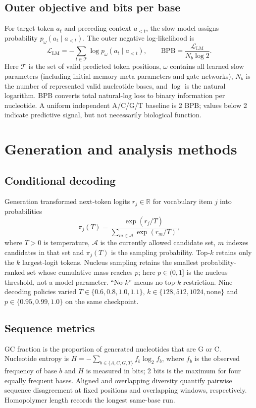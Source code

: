 \documentclass[10pt,twocolumn]{article}
\newcommand{\R}{\mathbb{R}}
\begin{document}
\subsection*{Outer objective and bits per base}
For target token $a_t$ and preceding context $a_{<t}$, the slow model assigns probability $p_{\omega}(a_t\mid a_{<t})$. The outer negative log-likelihood is
\begin{equation}
\mathcal L_{\mathrm{LM}}=-\sum_{t\in\mathcal T}\log p_{\omega}(a_t\mid a_{<t}),\qquad
\mathrm{BPB}=\frac{\mathcal L_{\mathrm{LM}}}{N_b\log 2}.\label{eq:bpb}
\end{equation}
Here $\mathcal T$ is the set of valid predicted token positions, $\omega$ contains all learned slow parameters (including initial memory meta-parameters and gate networks), $N_b$ is the number of represented valid nucleotide bases, and $\log$ is the natural logarithm. BPB converts total natural-log loss to binary information per nucleotide. A uniform independent A/C/G/T baseline is 2 BPB; values below 2 indicate predictive signal, but not necessarily biological function.

\section*{Generation and analysis methods}
\subsection*{Conditional decoding}
Generation transformed next-token logits $r_j\in\R$ for vocabulary item $j$ into probabilities
\begin{equation}
\pi_j(T)=\frac{\exp(r_j/T)}{\sum_{m\in\mathcal A}\exp(r_m/T)},\label{eq:softmax}
\end{equation}
where $T>0$ is temperature, $\mathcal A$ is the currently allowed candidate set, $m$ indexes candidates in that set and $\pi_j(T)$ is the sampling probability. Top-$k$ retains only the $k$ largest-logit tokens. Nucleus sampling retains the smallest probability-ranked set whose cumulative mass reaches $p$; here $p\in(0,1]$ is the nucleus threshold, not a model parameter. ``No-$k$'' means no top-$k$ restriction. Nine decoding policies varied $T\in\{0.6,0.8,1.0,1.1\}$, $k\in\{128,512,1024,\text{none}\}$ and $p\in\{0.95,0.99,1.0\}$ on the same checkpoint.

\subsection*{Sequence metrics}
GC fraction is the proportion of generated nucleotides that are G or C. Nucleotide entropy is $H=-\sum_{b\in\{A,C,G,T\}}f_b\log_2 f_b$, where $f_b$ is the observed frequency of base $b$ and $H$ is measured in bits; 2 bits is the maximum for four equally frequent bases. Aligned and overlapping diversity quantify pairwise sequence disagreement at fixed positions and overlapping windows, respectively. Homopolymer length records the longest same-base run.
\end{document}
